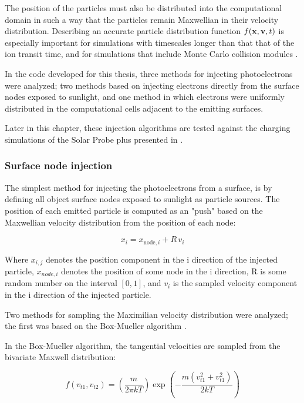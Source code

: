 The position of the particles must also be distributed into the computational domain in such a way that the particles remain Maxwellian in their velocity distribution. Describing an accurate particle distribution function $f(\vb{x}, \vb{v}, t)$ is especially important for simulations with timescales longer than that that of the ion transit time, and for simulations that include Monte Carlo collision modules \parencite{Cartwright2000}.  

In the code developed for this thesis, three methods for injecting photoelectrons were analyzed; two methods based on injecting electrons directly from the surface nodes exposed to sunlight, and one method in which electrons were uniformly distributed in the computational cells adjacent to the emitting surfaces.

Later in this chapter, these injection algorithms are tested against the charging simulations of the Solar Probe plus presented in \parencite{Deca2013}.

\subsubsection*{Surface node injection}

The simplest method for injecting the photoelectrons from a surface, is by defining all object surface nodes exposed to sunlight as particle sources. The position of each emitted particle is computed as an "push" based on the Maxwellian velocity distribution from the position of each node:

\begin{equation}\label{eq:injection}
    x_i = x_{\text{node},i} + R \, v_i
\end{equation}

Where $x_{i,j}$ denotes the position component in the i direction of the injected particle, $x_{node,i}$ denotes the position of some node in the i direction, R is some random number on the interval $[0,1]$, and $v_i$ is the sampled velocity component in the i direction of the injected particle.

Two methods for sampling the Maximilian velocity distribution were analyzed; the first was based on the Box-Mueller algorithm \parencite{Deca2013}.

In the Box-Mueller algorithm, the tangential velocities are sampled from the bivariate Maxwell distribution:

\begin{equation}\label{eq:bivariateMaxell}
    f(v_{t1}, v_{t2}) = \left(\frac{m}{2 \pi k T}  \right) \exp \left(- \frac{m (v^2_{t1} + v^2_{t1})}{2 k T} \right)
\end{equation}

